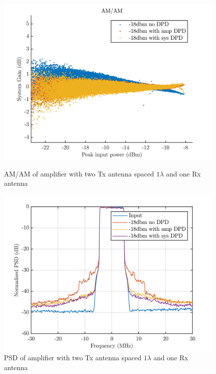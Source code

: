 \begin{figure}[H]
  \centering
  \begin{minipage}[b]{0.5\textwidth}
	\includegraphics[scale = 0.5]{figures/measurement/cree/two/amam_two_ant_1p0.png}
	\caption{AM/AM of amplifier with two Tx antenna spaced $1\lambda$ and one Rx antenna}
    \label{fig:cree_amam_two_ant6}
  \end{minipage}
  \hfill
  \begin{minipage}[b]{0.4\textwidth}
\includegraphics[scale = 0.5]{figures/measurement/cree/two/psd_two_ant_1p0.png}
\caption{PSD of amplifier with two Tx antenna spaced $1\lambda$ and one Rx antenna}
    \label{fig:cree_psd_two_ant6}
  \end{minipage}
\end{figure}



